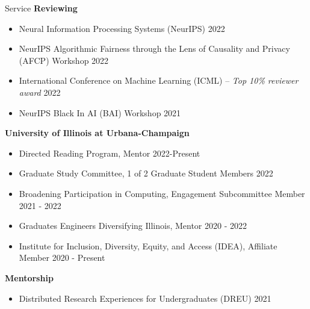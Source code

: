 \documentclass{resume} %
\begin{document}
\begin{rSection}{Service}
\textbf{Reviewing}
\begin{itemize}[label={}]
    \setlength\itemsep{0em}
    \item Neural Information Processing Systems (NeurIPS) \hfill 2022
    \item NeurIPS Algorithmic Fairness through the Lens of Causality and Privacy (AFCP) Workshop \hfill 2022
    \item International Conference on Machine Learning (ICML) -- \textit{Top 10\% reviewer award} \hfill 2022
    \item NeurIPS Black In AI (BAI) Workshop \hfill 2021
\end{itemize}

\textbf{University of Illinois at Urbana-Champaign}
\begin{itemize}[label={}]
    \setlength\itemsep{0em}
    \item Directed Reading Program, Mentor \hfill 2022-Present
    \item Graduate Study Committee, 1 of 2 Graduate Student
    Members \hfill 2022
    \item Broadening Participation in Computing, Engagement Subcommittee Member
    \hfill 2021 - 2022
    \item Graduates Engineers Diversifying Illinois, Mentor \hfill
    2020 - 2022
    \item Institute for Inclusion, Diversity, Equity, and
    Access (IDEA), Affiliate Member \hfill 2020 - Present
\end{itemize}

\textbf{Mentorship}
\begin{itemize}[label={}]
    \setlength\itemsep{0em}
    \item Distributed Research Experiences for Undergraduates (DREU) \hfill 2021
\end{itemize}
\end{rSection}
\end{document}
